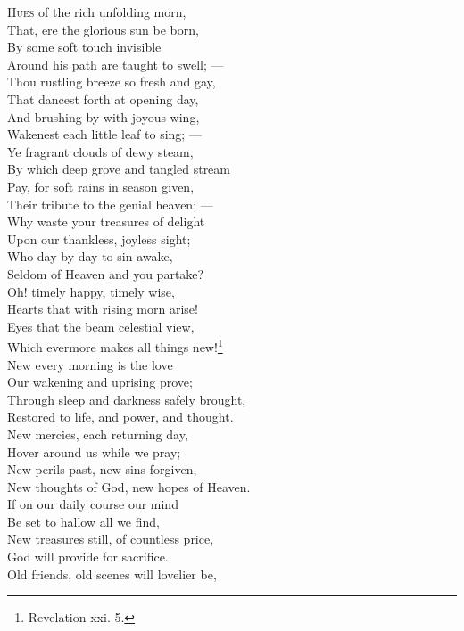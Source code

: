 \textsc{Hues} of the rich unfolding morn, \\
 That, ere the glorious sun be born, \\
  By some soft touch invisible \\
 Around his path are taught to swell; — \\
  Thou rustling breeze so fresh and gay, \\
 That dancest forth at opening day, \\
 And brushing by with joyous wing, \\
 Wakenest each little leaf to sing; — \\
  Ye fragrant clouds of dewy steam, \\
 By which deep grove and tangled stream \\
 Pay, for soft rains in season given, \\
 Their tribute to the genial heaven; — \\
  Why waste your treasures of delight \\
 Upon our thankless, joyless sight; \\
 Who day by day to sin awake, \\
 Seldom of Heaven and you partake? \\
  Oh! timely happy, timely wise, \\
 Hearts that with rising morn arise! \\
 Eyes that the beam celestial view, \\
 Which evermore makes all things new!\footnote{Revelation xxi. 5.} \\
  New every morning is the love \\
 Our wakening and uprising prove; \\
 Through sleep and darkness safely brought, \\
 Restored to life, and power, and thought. \\
  New mercies, each returning day, \\
 Hover around us while we pray; \\
 New perils past, new sins forgiven, \\
 New thoughts of God, new hopes of Heaven. \\
  If on our daily course our mind \\
 Be set to hallow all we find, \\
 New treasures still, of countless price, \\
 God will provide for sacrifice. \\
  Old friends, old scenes will lovelier be, \\
